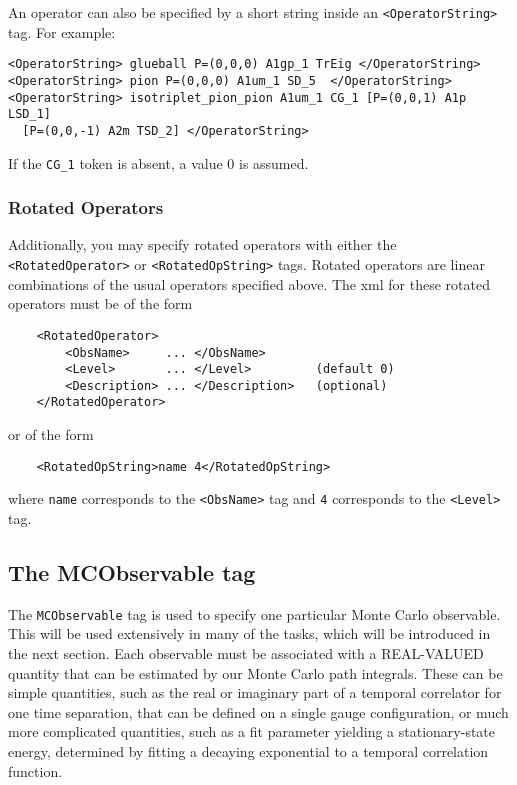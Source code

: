 \documentclass[12pt,notitlepage,letterpaper]{article}
\newcommand{\vb}{\texttt}
\begin{document}
An operator can also be specified by a short string inside an 
\vb{<OperatorString>} tag.  For example:                                                       
\begin{verbatim}
<OperatorString> glueball P=(0,0,0) A1gp_1 TrEig </OperatorString>                        
<OperatorString> pion P=(0,0,0) A1um_1 SD_5  </OperatorString>                            
<OperatorString> isotriplet_pion_pion A1um_1 CG_1 [P=(0,0,1) A1p LSD_1] 
  [P=(0,0,-1) A2m TSD_2] </OperatorString>   
\end{verbatim}                                                              
If the \vb{CG\_1} token is absent, a value 0 is assumed.          

\subsubsection{Rotated Operators}

Additionally, you may specify rotated operators with either
the \vb{<RotatedOperator>} or \vb{<RotatedOpString>} tags.
Rotated operators are linear combinations of the usual operators
specified above. The xml for these rotated operators must be
of the form
\begin{verbatim}
    <RotatedOperator>
        <ObsName>     ... </ObsName>
        <Level>       ... </Level>         (default 0)
        <Description> ... </Description>   (optional)
    </RotatedOperator>
\end{verbatim}
or of the form
\begin{verbatim}
    <RotatedOpString>name 4</RotatedOpString>
\end{verbatim}
where \vb{name} corresponds to the \vb{<ObsName>} tag and
\vb{4} corresponds to the \vb{<Level>} tag.

\subsection{The MCObservable tag}

The \vb{MCObservable} tag is used to specify one particular
Monte Carlo observable. This will be used extensively in many
of the tasks, which will be introduced in the next section.
Each observable must be associated with a REAL-VALUED quantity that can be
estimated by our Monte Carlo path integrals. These can be
simple quantities, such as the real or imaginary part of
a temporal correlator for one time separation, that can be
defined on a single gauge configuration, or much more
complicated quantities, such as a fit parameter yielding a
stationary-state energy, determined by fitting a decaying
exponential to a temporal correlation function.
\end{document}
